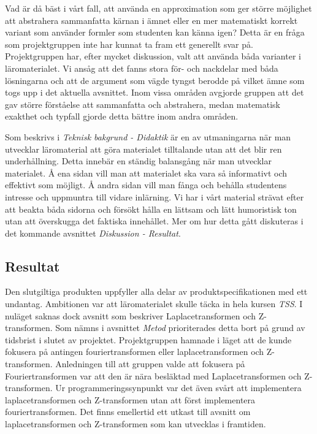 \documentclass[]{article}
\begin{document}
Vad är då bäst i vårt fall, att använda en approximation som ger
större möjlighet att abstrahera
sammanfatta kärnan i ämnet eller
en mer matematiskt korrekt variant som använder formler som studenten
kan känna igen? Detta är en fråga som projektgruppen inte har kunnat
ta fram ett generellt svar på. Projektgruppen har, efter mycket
diskussion, valt att använda båda varianter i läromaterialet. Vi ansåg
att det fanns stora för- och nackdelar med båda lösningarna och att de
argument som vägde tyngst berodde på vilket ämne som togs upp i det
aktuella avsnittet. Inom vissa områden avgjorde gruppen att det gav
större förståelse att sammanfatta och abstrahera, medan matematisk
exakthet och typfall gjorde detta bättre inom andra områden.

Som beskrivs i \textit{Teknisk bakgrund - Didaktik} är en av
utmaningarna när man utvecklar läromaterial att göra materialet
tilltalande utan att det blir ren underhållning. Detta innebär en
ständig balansgång när man utvecklar materialet. Å ena sidan vill man
att materialet ska vara så informativt och effektivt som möjligt. Å
andra sidan vill man fånga och behålla studentens intresse och
uppmuntra till vidare inlärning. Vi har i vårt material strävat efter
att beakta båda sidorna och försökt hålla en lättsam och lätt
humoristisk ton utan att överskugga det faktiska innehållet. Mer om
hur detta gått diskuteras i det kommande avsnittet \textit{Diskussion
 - Resultat}.

\subsection{Resultat}
Den slutgiltiga produkten uppfyller alla delar av
produktspecifikationen med ett undantag. Ambitionen var att
läromaterialet skulle täcka in hela kursen \textit{TSS}. I nuläget
saknas dock avsnitt som beskriver Laplacetransformen och
Z-transformen. Som nämns i avsnittet \textit{Metod} prioriterades
detta bort på grund av tidsbrist i slutet av projektet. Projektgruppen
hamnade i läget att de kunde fokusera på antingen fouriertransformen
eller laplacetransformen och Z-transformen. Anledningen till att
gruppen valde att fokusera på Fouriertransformen var att den är nära
besläktad med Laplacetransformen och Z-transformen. Ur 
programmeringssynpunkt var det även svårt att implementera
laplacetransformen och Z-transformen utan att först implementera fouriertransformen. Det finns emellertid ett utkast
till avsnitt om laplacetransformen och Z-transformen som kan utvecklas i framtiden.
\end{document}
